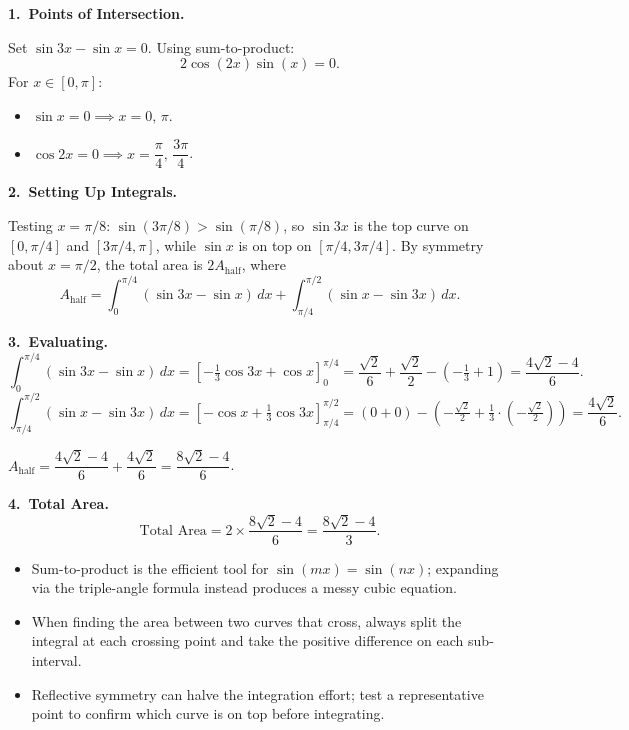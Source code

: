 \begin{solution}
\textbf{1.\ Points of Intersection.}

Set $\sin 3x - \sin x = 0$. Using sum-to-product:
\[
2\cos(2x)\sin(x) = 0.
\]
For $x \in [0, \pi]$:
\begin{itemize}[leftmargin=*]
  \item $\sin x = 0 \implies x = 0,\, \pi$.
  \item $\cos 2x = 0 \implies x = \dfrac{\pi}{4},\, \dfrac{3\pi}{4}$.
\end{itemize}

\textbf{2.\ Setting Up Integrals.}

Testing $x = \pi/8$: $\sin(3\pi/8) > \sin(\pi/8)$, so $\sin 3x$ is the top curve on
$[0, \pi/4]$ and $[3\pi/4, \pi]$, while $\sin x$ is on top on $[\pi/4, 3\pi/4]$.
By symmetry about $x = \pi/2$, the total area is $2A_{\mathrm{half}}$, where
\[
A_{\mathrm{half}}
= \int_0^{\pi/4}(\sin 3x - \sin x)\,dx
+ \int_{\pi/4}^{\pi/2}(\sin x - \sin 3x)\,dx.
\]

\textbf{3.\ Evaluating.}
\[
\int_0^{\pi/4}(\sin 3x - \sin x)\,dx
= \left[-\tfrac{1}{3}\cos 3x + \cos x\right]_0^{\pi/4}
= \frac{\sqrt{2}}{6} + \frac{\sqrt{2}}{2} - \left(-\tfrac{1}{3}+1\right)
= \frac{4\sqrt{2}-4}{6}.
\]
\[
\int_{\pi/4}^{\pi/2}(\sin x - \sin 3x)\,dx
= \left[-\cos x + \tfrac{1}{3}\cos 3x\right]_{\pi/4}^{\pi/2}
= (0+0)-\!\left(-\tfrac{\sqrt{2}}{2}+\tfrac{1}{3}\!\cdot\!\left(-\tfrac{\sqrt{2}}{2}\right)\right)
= \frac{4\sqrt{2}}{6}.
\]

$A_{\mathrm{half}} = \dfrac{4\sqrt{2}-4}{6} + \dfrac{4\sqrt{2}}{6} = \dfrac{8\sqrt{2}-4}{6}$.

\textbf{4.\ Total Area.}
\[
\text{Total Area} = 2\times\frac{8\sqrt{2}-4}{6} = \frac{8\sqrt{2}-4}{3}.
\]
\end{solution}

\begin{takeaways}
\begin{itemize}[leftmargin=*]
  \item Sum-to-product is the efficient tool for $\sin(mx) = \sin(nx)$; expanding via the
        triple-angle formula instead produces a messy cubic equation.
  \item When finding the area between two curves that cross, always split the integral at each
        crossing point and take the positive difference on each sub-interval.
  \item Reflective symmetry can halve the integration effort; test a representative point to
        confirm which curve is on top before integrating.
\end{itemize}
\end{takeaways}

